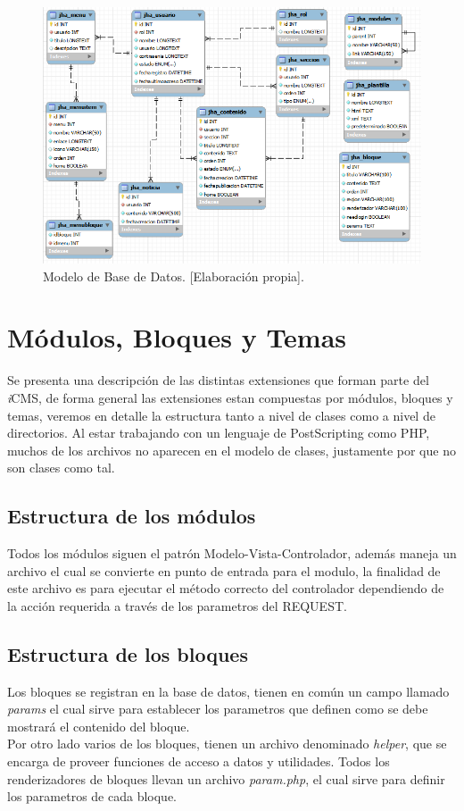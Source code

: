 \begin{figure}[h]
\centering
\includegraphics[scale=.6, keepaspectratio=true]{imagenes/12_imagen.png}
\caption{Modelo de Base de Datos. [Elaboraci\'on propia].}
\end{figure}

\section{M\'odulos, Bloques y Temas}
Se presenta una descripci\'on de las distintas extensiones que forman parte del \textit{i}CMS, de forma general las extensiones estan compuestas por m\'odulos, bloques y temas, veremos en detalle la estructura tanto a nivel de clases como a nivel de directorios. Al estar trabajando con un lenguaje de PostScripting como PHP, muchos de los archivos no aparecen en el modelo de clases, justamente por que no son clases como tal.

\subsection{Estructura de los m\'odulos}
Todos los m\'odulos siguen el patr\'on Modelo-Vista-Controlador, adem\'as maneja un archivo el cual se convierte en punto de entrada para el modulo, la finalidad de este archivo es para ejecutar el m\'etodo correcto del controlador dependiendo de la acci\'on requerida a trav\'es de los parametros del REQUEST.

\subsection{Estructura de los bloques}
Los bloques se registran en la base de datos, tienen en com\'un un campo llamado \textit{params} el cual sirve para establecer los parametros que definen como se debe mostrar\'a el contenido del bloque.\\
Por otro lado varios de los bloques, tienen un archivo denominado \textit{helper}, que se encarga de proveer funciones de acceso a datos y utilidades.
Todos los renderizadores de bloques llevan un archivo \textit{param.php}, el cual sirve para definir los parametros de cada bloque.

